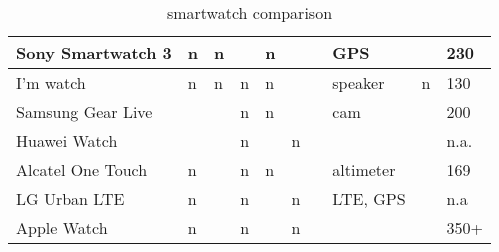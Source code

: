 \begin{table}[h]
\begin{tabular}{|l|l|l|l|l|l|l|l|l|l|}
\cellcolor[HTML]{F8FF00}Sony Smartwatch 3 & \cellcolor[HTML]{FE0000}n & \cellcolor[HTML]{FE0000}n & \cellcolor[HTML]{32CB00}  & \cellcolor[HTML]{FE0000}n & \cellcolor[HTML]{32CB00}  & \cellcolor[HTML]{32CB00} & GPS                 & \cellcolor[HTML]{32CB00}  & 230                         \\ \hline
I’m watch                                 & \cellcolor[HTML]{FE0000}n & \cellcolor[HTML]{FE0000}n & \cellcolor[HTML]{FE0000}n & \cellcolor[HTML]{FE0000}n & \cellcolor[HTML]{32CB00}  & \cellcolor[HTML]{32CB00} & speaker             & \cellcolor[HTML]{FE0000}n & 130                         \\ \hline
Samsung Gear Live                         & \cellcolor[HTML]{32CB00}  & \cellcolor[HTML]{32CB00}  & \cellcolor[HTML]{FE0000}n & \cellcolor[HTML]{FE0000}n & \cellcolor[HTML]{32CB00}  & \cellcolor[HTML]{32CB00} & cam                 & \cellcolor[HTML]{32CB00}  & 200                         \\ \hline
Huawei Watch                              & \cellcolor[HTML]{32CB00}  & \cellcolor[HTML]{32CB00}  & \cellcolor[HTML]{FE0000}n & \cellcolor[HTML]{32CB00}  & \cellcolor[HTML]{FE0000}n & \cellcolor[HTML]{32CB00} &                     & \cellcolor[HTML]{32CB00}  & n.a.                        \\ \hline
Alcatel One Touch                         & \cellcolor[HTML]{FE0000}n & \cellcolor[HTML]{32CB00}  & \cellcolor[HTML]{FE0000}n & \cellcolor[HTML]{FE0000}n & \cellcolor[HTML]{32CB00}  & \cellcolor[HTML]{32CB00} & altimeter           & \cellcolor[HTML]{32CB00}  & 169                         \\ \hline
LG Urban LTE                              & \cellcolor[HTML]{FE0000}n & \cellcolor[HTML]{32CB00}  & \cellcolor[HTML]{FE0000}n & \cellcolor[HTML]{32CB00}  & \cellcolor[HTML]{FE0000}n & \cellcolor[HTML]{32CB00} & LTE, GPS            & \cellcolor[HTML]{32CB00}  & \cellcolor[HTML]{FFFFFF}n.a \\ \hline
\cellcolor[HTML]{FCFF2F}Apple Watch       & \cellcolor[HTML]{FE0000}n & \cellcolor[HTML]{32CB00}  & \cellcolor[HTML]{FE0000}n & \cellcolor[HTML]{32CB00}  & \cellcolor[HTML]{FE0000}n & \cellcolor[HTML]{32CB00} &                     & \cellcolor[HTML]{32CB00}  & 350+                        \\ \hline
\end{tabular}
\caption{ smartwatch comparison }
\end{table}
\pagebreak